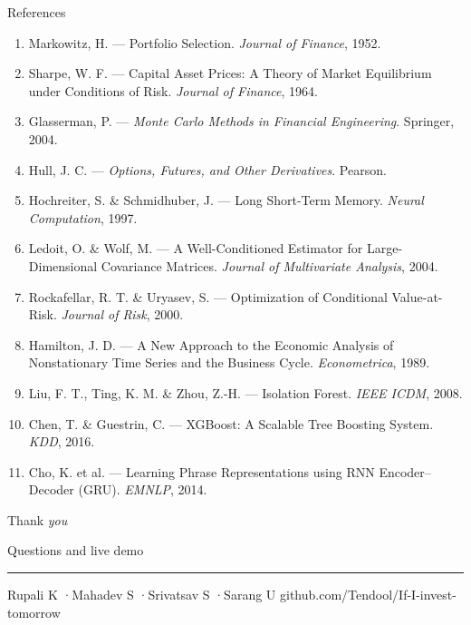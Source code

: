 \documentclass[aspectratio=169,11pt]{beamer}
\begin{document}
\begin{frame}{References}
  \vspace{0.1cm}
  \footnotesize
  \begin{enumerate}\setlength{\itemsep}{2.5pt}
    \item Markowitz, H. --- Portfolio Selection. \emph{Journal of Finance}, 1952.
    \item Sharpe, W. F. --- Capital Asset Prices: A Theory of Market Equilibrium under Conditions of Risk. \emph{Journal of Finance}, 1964.
    \item Glasserman, P. --- \emph{Monte Carlo Methods in Financial Engineering}. Springer, 2004.
    \item Hull, J. C. --- \emph{Options, Futures, and Other Derivatives}. Pearson.
    \item Hochreiter, S. \& Schmidhuber, J. --- Long Short-Term Memory. \emph{Neural Computation}, 1997.
    \item Ledoit, O. \& Wolf, M. --- A Well-Conditioned Estimator for Large-Dimensional Covariance Matrices. \emph{Journal of Multivariate Analysis}, 2004.
    \item Rockafellar, R. T. \& Uryasev, S. --- Optimization of Conditional Value-at-Risk. \emph{Journal of Risk}, 2000.
    \item Hamilton, J. D. --- A New Approach to the Economic Analysis of Nonstationary Time Series and the Business Cycle. \emph{Econometrica}, 1989.
    \item Liu, F. T., Ting, K. M. \& Zhou, Z.-H. --- Isolation Forest. \emph{IEEE ICDM}, 2008.
    \item Chen, T. \& Guestrin, C. --- XGBoost: A Scalable Tree Boosting System. \emph{KDD}, 2016.
    \item Cho, K. et al. --- Learning Phrase Representations using RNN Encoder--Decoder (GRU). \emph{EMNLP}, 2014.
  \end{enumerate}
\end{frame}

\begin{frame}[plain]
  \vspace*{2.2cm}
  \hspace*{0.15cm}\begin{minipage}{0.9\textwidth}
    {\displayfont\fontsize{38}{40}\selectfont Thank \textit{you}\par}\vspace{0.3cm}
    {\fontsize{13}{16}\selectfont\color{muted}Questions and live demo\par}\vspace{0.7cm}
    {\color{rulec}\rule{\linewidth}{0.4pt}}\par\vspace{0.25cm}
    {\small\color{muted}Rupali K \enspace·\enspace Mahadev S \enspace·\enspace Srivatsav S \enspace·\enspace Sarang U \hfill github.com/Tendool/If-I-invest-tomorrow}
  \end{minipage}
\end{frame}
\end{document}
